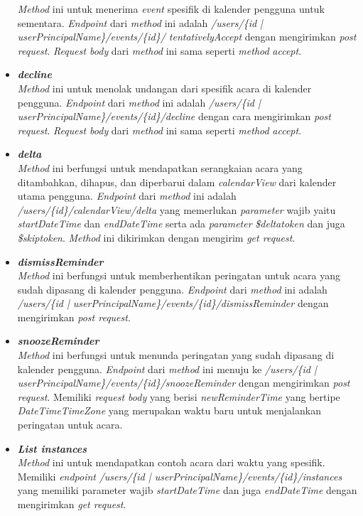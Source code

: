 \begin{itemize}
	\textit{Method} ini untuk menerima \textit{event} spesifik di kalender pengguna untuk sementara. \textit{Endpoint} dari \textit{method} ini adalah \textit{/users/\{id | userPrincipalName\}/events/\{id\}/ tentativelyAccept} dengan mengirimkan \textit{post request}. \textit{Request body} dari \textit{method} ini sama seperti \textit{method} \textit{accept}.
	\item \textbf{\textit{decline}}\\
	\textit{Method} ini untuk menolak undangan dari spesifik acara di kalender pengguna. \textit{Endpoint} dari \textit{method} ini adalah \textit{/users/\{id | userPrincipalName\}/events/\{id\}/decline} dengan cara mengirimkan \textit{post request}. \textit{Request body} dari \textit{method} ini sama seperti \textit{method} \textit{accept}.   
	\item \textbf{\textit{delta}}\\
	\textit{Method} ini berfungsi untuk mendapatkan serangkaian acara yang ditambahkan, dihapus, dan diperbarui dalam \textit{calendarView} dari kalender utama pengguna. \textit{Endpoint} dari \textit{method} ini adalah \textit{/users/\{id\}/calendarView/delta} yang memerlukan \textit{parameter} wajib yaitu \textit{startDateTime} dan \textit{endDateTime} serta ada \textit{parameter} \textit{\$deltatoken} dan juga \textit{\$skiptoken}. \textit{Method} ini dikirimkan dengan mengirim \textit{get request}.  
	\item \textbf{\textit{dismissReminder}}\\
	\textit{Method} ini berfungsi untuk memberhentikan peringatan untuk acara yang sudah dipasang di kalender pengguna. \textit{Endpoint} dari \textit{method} ini adalah \textit{/users/\{id | userPrincipalName\}/events/\{id\}/dismissReminder} dengan mengirimkan \textit{post request}. 
	\item \textbf{\textit{snoozeReminder}}\\
	\textit{Method} ini berfungsi untuk menunda peringatan yang sudah dipasang di kalender pengguna. \textit{Endpoint} dari \textit{method} ini menuju ke \textit{/users/\{id | userPrincipalName\}/events/\{id\}/snoozeReminder} dengan mengirimkan \textit{post request}. Memiliki \textit{request body} yang berisi \textit{newReminderTime} yang bertipe \textit{DateTimeTimeZone} yang merupakan waktu baru untuk menjalankan peringatan untuk acara.  
	\item \textbf{\textit{List instances}}\\
	\textit{Method} ini untuk mendapatkan contoh acara dari waktu yang spesifik. Memiliki \textit{endpoint} \textit{/users/\{id | userPrincipalName\}/events/\{id\}/instances} yang memiliki parameter wajib \textit{startDateTime} dan juga \textit{endDateTime} dengan mengirimkan \textit{get request}. 

\end{itemize}
